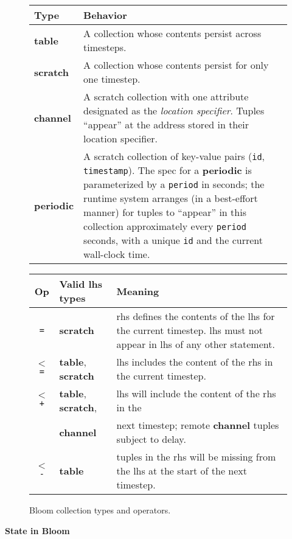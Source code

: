 \begin{figure}
	\begin{small}
	\begin{tabular}{|l|p{2.55in}|}
		\hline
		Type & Behavior\\
		\hline
		\textbf{table} & A collection whose contents persist across timesteps.\\
		\textbf{scratch} & A collection whose contents persist for only one timestep.\\
		\textbf{channel} & A scratch collection with one attribute designated as the {\em location specifier}. Tuples ``appear'' at the address stored in their location specifier.\\
		\textbf{periodic} & A scratch collection of key-value pairs (\texttt{id}, \texttt{timestamp}).  The spec for a \textbf{periodic} is parameterized by a \texttt{period} in seconds; the runtime system arranges (in a best-effort manner) for tuples to ``appear'' in this collection approximately every \texttt{period} seconds, with a unique \texttt{id} and the current wall-clock time.\\
		\hline
	\end{tabular}

	\vspace{2em}
	
	\begin{tabular}{|c|l|p{2in}|}
		\hline
		Op & Valid lhs types & Meaning\\
				\hline 
		\texttt{=} & \textbf{scratch} & rhs defines the contents of the lhs for the current timestep.  lhs must not appear in lhs of any other statement.\\
		\texttt{$<$=} & \textbf{table}, \textbf{scratch} & lhs includes the content of the rhs in the current timestep.\\
		\texttt{$<$+} & \textbf{table}, \textbf{scratch}, & lhs will include the content of the rhs in the\\
		              & \textbf{channel} &  next timestep; remote \textbf{channel} tuples subject to delay.\\
		\texttt{$<$-} & \textbf{table} & tuples in the rhs will be missing from the lhs at the start of  the next timestep.\\
		\hline
	\end{tabular}
	\end{small}
	\caption{Bloom collection types and operators.}
	\label{tab:bloom}
\end{figure}

\noindent\textbf{State in Bloom}\\
\noindent

